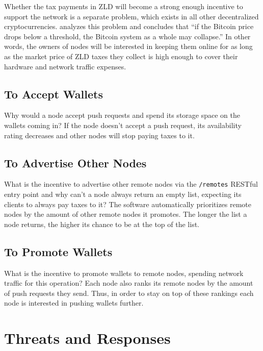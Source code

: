 \documentclass[11pt,oneside]{article}
\newcommand\dd[1]{\colorbox{gray!30}{\texttt{#1}}}
\begin{document}
Whether the tax payments in ZLD will become a strong enough incentive
to support the network is a separate problem, which exists in all
other decentralized cryptocurrencies. \textcite{iwamura2014} analyzes this
problem and concludes that ``if the Bitcoin price drops below
a threshold, the Bitcoin system as a whole may collapse.'' In other words,
the owners of nodes will be interested in keeping them online for as long
as the market price of ZLD taxes they collect is high enough to cover
their hardware and network traffic expenses.

\subsection{To Accept Wallets}

Why would a node accept push requests and spend its storage space
on the wallets coming in? If the node doesn't accept a push request,
its availability rating decreases and other nodes will stop paying
taxes to it.

\subsection{To Advertise Other Nodes}

What is the incentive to advertise other remote nodes via the \dd{/remotes} RESTful
entry point and why can't a node always return an empty list, expecting its clients
to always pay taxes to it? The software automatically prioritizes remote
nodes by the amount of other remote nodes it promotes. The longer the list a node
returns, the higher its chance to be at the top of the list.

\subsection{To Promote Wallets}

What is the incentive to promote wallets to remote nodes, spending network
traffic for this operation? Each node also ranks its remote nodes by the
amount of push requests they send. Thus, in order to stay on top of these rankings
each node is interested in pushing wallets further.


\section{Threats and Responses}\label{sec:threats}
\end{document}
